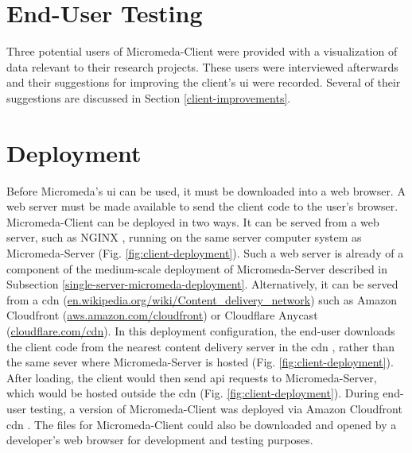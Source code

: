 \section{End-User Testing}

Three potential users of Micromeda-Client were provided with a visualization of data relevant to their research projects. These users were interviewed afterwards and their suggestions for improving the client's \gls{ui} were recorded. Several of their suggestions are discussed in Section \ref{client-improvements}. 

\section{Deployment}

Before Micromeda's \gls{ui} can be used, it must be downloaded into a web browser. A web server must be made available to send the client code to the user's browser. Micromeda-Client can be deployed in two ways. It can be served from a web server, such as NGINX \cite{reese2008nginx}, running on the same server computer system as Micromeda-Server (Fig. \ref{fig:client-deployment}). Such a web server is already of a component of the medium-scale deployment of Micromeda-Server described in Subsection \ref{single-server-micromeda-deployment}. Alternatively, it can be served from a \gls{cdn} \cite{farber2003internet} (\href{http://en.wikipedia.org/wiki/Content_delivery_network}{en.wikipedia.org/wiki/Content\_delivery\_network}) such as Amazon Cloudfront \cite{varia2014overview} (\href{http://aws.amazon.com/cloudfront}{aws.amazon.com/cloudfront}) or Cloudflare Anycast \cite{calder2015analyzing} (\href{http://cloudflare.com/cdn}{cloudflare.com/cdn}). In this deployment configuration, the end-user downloads the client code from the nearest content delivery server in the \gls{cdn} , rather than the same sever where Micromeda-Server is hosted (Fig. \ref{fig:client-deployment}). After loading, the client would then send \gls{api} requests to Micromeda-Server, which would be hosted outside the \gls{cdn}  (Fig. \ref{fig:client-deployment}). During end-user testing, a version of Micromeda-Client was deployed via Amazon Cloudfront \gls{cdn} . The files for Micromeda-Client could also be downloaded and opened by a developer's web browser for development and testing purposes.

